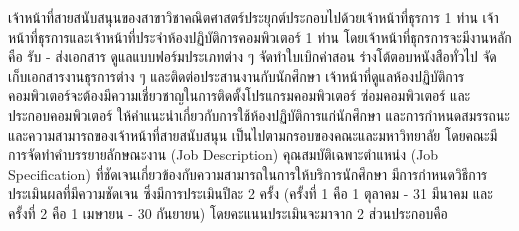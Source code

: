 \begin{doclist}
\end{doclist}


เจ้าหน้าที่สายสนับสนุนของสาขาวิชาคณิตศาสตร์ประยุกต์ประกอบไปด้วยเจ้าหน้าที่ธุรการ 1 ท่าน เจ้าหน้าที่ธุรการและเจ้าหน้าที่ประจำห้องปฏิบัติการคอมพิวเตอร์ 1 ท่าน โดยเจ้าหน้าที่ธุกรการจะมีงานหลักคือ  รับ - ส่งเอกสาร ดูแลแบบฟอร์มประเภทต่าง ๆ จัดทำใบเบิกค่าสอน ร่างโต้ตอบหนังสือทั่วไป จัดเก็บเอกสารงานธุรการต่าง ๆ และติดต่อประสานงานกับนักศึกษา เจ้าหน้าที่ดูแลห้องปฏิบัติการคอมพิวเตอร์จะต้องมีความเชี่ยวชาญในการติดตั้งโปรแกรมคอมพิวเตอร์ ซ่อมคอมพิวเตอร์ และประกอบคอมพิวเตอร์ ให้คำแนะนำเกี่ยวกับการใช้ห้องปฏิบัติการแก่นักศึกษา และการกำหนดสมรรถนะและความสามารถของเจ้าหน้าที่สายสนับสนุน เป็นไปตามกรอบของคณะและมหาวิทยาลัย  โดยคณะมีการจัดทำคำบรรยายลักษณะงาน  (Job Description) คุณสมบัติเฉพาะตำแหน่ง  (Job Specification)  ที่ชัดเจนเกี่ยวข้องกับความสามารถในการให้บริการนักศึกษา มีการกำหนดวิธีการประเมินผลที่มีความชัดเจน ซึ่งมีการประเมินปีละ 2 ครั้ง (ครั้งที่ 1 คือ 1 ตุลาคม - 31 มีนาคม และ ครั้งที่ 2 คือ 1 เมษายน - 30 กันยายน)  โดยคะแนนประเมินจะมาจาก 2 ส่วนประกอบคือ 
